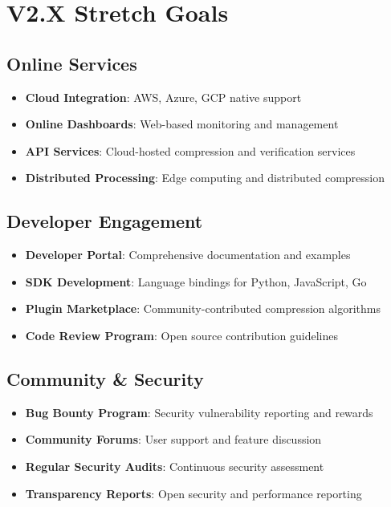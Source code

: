 \documentclass[12pt,a4paper]{article}
\begin{document}
\section{V2.X Stretch Goals}

\subsection{Online Services}
\begin{itemize}
    \item \textbf{Cloud Integration}: AWS, Azure, GCP native support
    \item \textbf{Online Dashboards}: Web-based monitoring and management
    \item \textbf{API Services}: Cloud-hosted compression and verification services
    \item \textbf{Distributed Processing}: Edge computing and distributed compression
\end{itemize}

\subsection{Developer Engagement}
\begin{itemize}
    \item \textbf{Developer Portal}: Comprehensive documentation and examples
    \item \textbf{SDK Development}: Language bindings for Python, JavaScript, Go
    \item \textbf{Plugin Marketplace}: Community-contributed compression algorithms
    \item \textbf{Code Review Program}: Open source contribution guidelines
\end{itemize}

\subsection{Community \& Security}
\begin{itemize}
    \item \textbf{Bug Bounty Program}: Security vulnerability reporting and rewards
    \item \textbf{Community Forums}: User support and feature discussion
    \item \textbf{Regular Security Audits}: Continuous security assessment
    \item \textbf{Transparency Reports}: Open security and performance reporting
\end{itemize}
\end{document}
